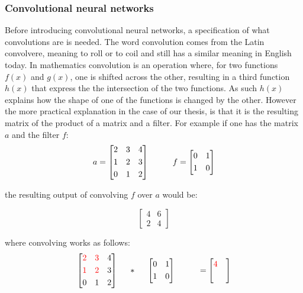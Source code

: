 \begin{multicols}{2}
\subsubsection{Convolutional neural networks}
Before introducing convolutional neural networks, a specification of what convolutions are is needed. The word convolution comes from the Latin convolvere, meaning to roll or to coil and still has a similar meaning in English today. In mathematics convolution is an operation where, for two functions $f(x)$ and $g(x)$, one is shifted across the other, resulting in a third function $h(x)$ that express the the intersection of the two functions. As such $h(x)$ explains how the shape of one of the functions is changed by the other. \citep[p. 267]{bishop-2006}
However the more practical explanation in the case of our thesis, is that it is the resulting matrix of the product of a matrix and a filter. For example if one has the matrix $a$ and the filter $f$:
\[
a = \begin{bmatrix}
       2 & 3 & 4           \\[0.3em]
       1 & 2 & 3 \\[0.3em]
       0 & 1 & 2
     \end{bmatrix}
\hspace*{1cm}
f = \begin{bmatrix}
       0 & 1 \\[0.3em]
       1 & 0        
     \end{bmatrix}     
\]

\noindent the resulting output of convolving $f$ over $a$ would be:

\[
\begin{bmatrix}
       4 & 6 \\[0.3em]
       2 & 4        
     \end{bmatrix}     
\]

where convolving works as follows:
\[
\begin{bmatrix}
       \textcolor{red}2 & \textcolor{red}3 & 4           \\[0.3em]
       \textcolor{red}1 & \textcolor{red}2 & 3 \\[0.3em]
       0 & 1 & 2
     \end{bmatrix}
\hspace*{0.5cm}
*
\hspace*{0.5cm}
\begin{bmatrix}
       0 & 1 \\[0.3em]
       1 & 0        
     \end{bmatrix}     
\hspace*{1cm}
 = \begin{bmatrix}
       \textcolor{red}4 &  \\[0.3em]
         &         
     \end{bmatrix}
\]


\end{multicols}
